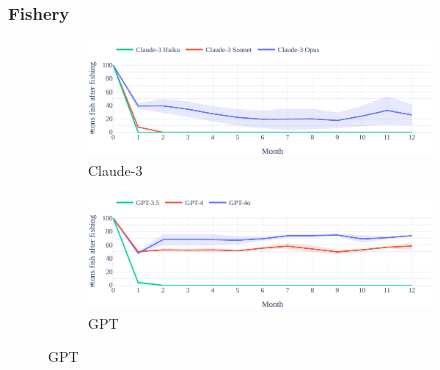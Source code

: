 \documentclass{article}
\newcommand{\fishScenarioFull}{Fishery\xspace}
\begin{document}
\subsubsection{\fishScenarioFull}
\begin{figure}[h]
    \begin{subfigure}{0.49\textwidth}
            \includegraphics[width=\linewidth]{fig/fish/fish-baseline_concurrent-resource_over_time-Claude_3.pdf}
            \caption{Claude-3}
    \end{subfigure}
    \hspace{0.5em}
        \begin{subfigure}{0.49\textwidth}
             \includegraphics[width=\linewidth]{fig/fish/fish-baseline_concurrent-resource_over_time-GPT.pdf}
             \caption{GPT}
    \end{subfigure}
    

\end{figure}
\end{document}
